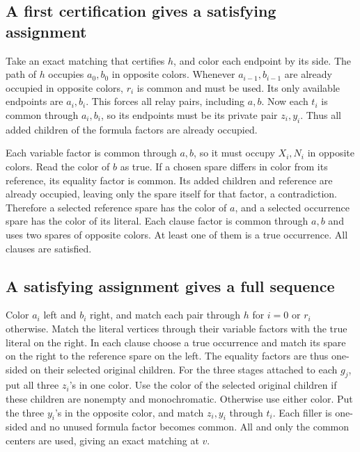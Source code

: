 \documentclass[11pt,a4paper]{amsart}
\begin{document}
\subsection{A first certification gives a satisfying assignment}

Take an exact matching that certifies \(h\), and color each endpoint by its side. The path of \(h\) occupies \(a_0,b_0\) in opposite colors. Whenever \(a_{i-1},b_{i-1}\) are already occupied in opposite colors, \(r_i\) is common and must be used. Its only available endpoints are \(a_i,b_i\). This forces all relay pairs, including \(a,b\). Now each \(t_i\) is common through \(a_i,b_i\), so its endpoints must be its private pair \(z_i,y_i\). Thus all added children of the formula factors are already occupied.

Each variable factor is common through \(a,b\), so it must occupy \(X_i,N_i\) in opposite colors. Read the color of \(b\) as true. If a chosen spare differs in color from its reference, its equality factor is common. Its added children and reference are already occupied, leaving only the spare itself for that factor, a contradiction. Therefore a selected reference spare has the color of \(a\), and a selected occurrence spare has the color of its literal. Each clause factor is common through \(a,b\) and uses two spares of opposite colors. At least one of them is a true occurrence. All clauses are satisfied.

\subsection{A satisfying assignment gives a full sequence}

Color \(a_i\) left and \(b_i\) right, and match each pair through \(h\) for \(i=0\) or \(r_i\) otherwise. Match the literal vertices through their variable factors with the true literal on the right. In each clause choose a true occurrence and match its spare on the right to the reference spare on the left. The equality factors are thus one-sided on their selected original children. For the three stages attached to each \(g_j\), put all three \(z_i\)'s in one color. Use the color of the selected original children if these children are nonempty and monochromatic. Otherwise use either color. Put the three \(y_i\)'s in the opposite color, and match \(z_i,y_i\) through \(t_i\). Each filler is one-sided and no unused formula factor becomes common. All and only the common centers are used, giving an exact matching at \(v\).
\end{document}
